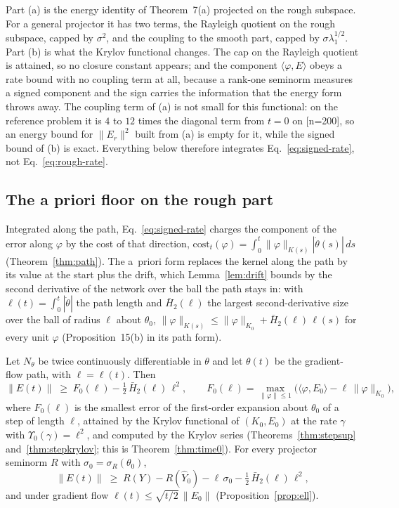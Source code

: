 Part (a) is the energy identity of Theorem~7(a) projected on the rough
subspace. For a general projector it has two terms, the Rayleigh quotient on
the rough subspace, capped by $\sigma^2$, and the coupling to the smooth part,
capped by $\sigma\lambda_1^{1/2}$. Part (b) is what the Krylov functional
changes. The cap on the Rayleigh quotient is attained, so no closure constant
appears; and the component $\langle\varphi,E\rangle$ obeys a rate bound with
no coupling term at all, because a rank-one seminorm measures a signed
component and the sign carries the information that the energy form throws
away. The coupling term of (a) is not small for this functional: on the
reference problem it is $4$ to $12$ times the diagonal term from $t=0$ on
[n=200], so an energy bound for $\|E_r\|^2$ built from (a) is empty for it,
while the signed bound of (b) is exact. Everything below therefore integrates
Eq.~\eqref{eq:signed-rate}, not Eq.~\eqref{eq:rough-rate}.

\subsection{The a priori floor on the rough part}

Integrated along the path, Eq.~\eqref{eq:signed-rate} charges the component
of the error along $\varphi$ by the cost of that direction,
$\mathrm{cost}_t(\varphi)=\int_0^t\|\varphi\|_{K(s)}|\dot\theta(s)|\,ds$
(Theorem~\ref{thm:path}). The a~priori form replaces the kernel along the path
by its value at the start plus the drift, which Lemma~\ref{lem:drift} bounds
by the second derivative of the network over the ball the path stays in:
with $\ell(t)=\int_0^t|\dot\theta|$ the path length and $\bar H_2(\ell)$ the
largest second-derivative size over the ball of radius $\ell$ about
$\theta_0$, $\|\varphi\|_{K(s)}\le\|\varphi\|_{K_0}+\bar H_2(\ell)\,\ell(s)$ for
every unit $\varphi$ (Proposition~15(b) in its path form).

\begin{theorem}
\label{thm:rough-apriori}
Let $N_\theta$ be twice continuously differentiable in $\theta$ and let
$\theta(t)$ be the gradient-flow path, with $\ell=\ell(t)$. Then
\begin{equation}
\|E(t)\| \;\ge\; F_0(\ell) - \tfrac12\,\bar H_2(\ell)\,\ell^2,
\qquad
F_0(\ell)=\max_{\|\varphi\|\le1}\Big(\langle\varphi,E_0\rangle-\ell\,\|\varphi\|_{K_0}\Big),
\label{eq:rough-floor-apriori}
\end{equation}
where $F_0(\ell)$ is the smallest error of the first-order expansion about
$\theta_0$ of a step of length $\ell$, attained by the Krylov functional of
$(K_0,E_0)$ at the rate $\gamma$ with $\Upsilon_0(\gamma)=\ell^2$, and
computed by the Krylov series (Theorems~\ref{thm:stepsup} and~\ref{thm:stepkrylov};
this is Theorem~\ref{thm:time0}). For every projector seminorm $R$ with
$\sigma_0=\sigma_R(\theta_0)$,
\begin{equation}
\|E(t)\| \;\ge\; R(Y)-R(\hat Y_0)-\ell\,\sigma_0-\tfrac12\,\bar H_2(\ell)\,\ell^2 ,
\label{eq:rough-floor-R}
\end{equation}
and under gradient flow $\ell(t)\le\sqrt{t/2}\,\|E_0\|$ (Proposition~\ref{prop:ell}).
\end{theorem}

